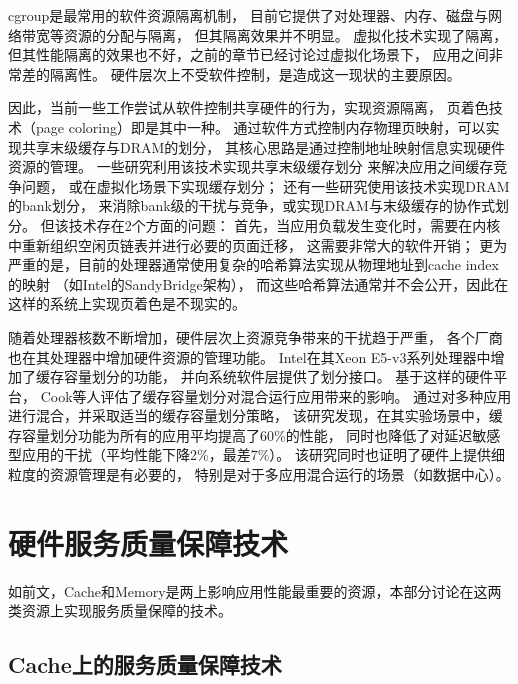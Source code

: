 cgroup\cite{cgroup}是最常用的软件资源隔离机制，
目前它提供了对处理器、内存、磁盘与网络带宽等资源的分配与隔离，
但其隔离效果并不明显。
虚拟化技术实现了隔离，但其性能隔离的效果也不好，之前的章节已经讨论过虚拟化场景下，
应用之间非常差的隔离性。
硬件层次上不受软件控制，是造成这一现状的主要原因。

因此，当前一些工作尝试从软件控制共享硬件的行为，实现资源隔离，
页着色技术（page coloring）即是其中一种。
通过软件方式控制内存物理页映射，可以实现共享末级缓存与DRAM的划分，
其核心思路是通过控制地址映射信息实现硬件资源的管理。
一些研究利用该技术实现共享末级缓存划分\cite{lin_gaining_2008, tam_managing_2007}
来解决应用之间缓存竞争问题，
或在虚拟化场景下实现缓存划分\cite{Jin2009, Chen2010, Wang2012}；
还有一些研究\cite{liu_software_2012}使用该技术实现DRAM的bank划分，
来消除bank级的干扰与竞争，或实现DRAM与末级缓存的协作式划分\cite{Liu:2014:ISCA}。
但该技术存在2个方面的问题：
首先，当应用负载发生变化时，需要在内核中重新组织空闲页链表并进行必要的页面迁移，
这需要非常大的软件开销；
更为严重的是，目前的处理器通常使用复杂的哈希算法实现从物理地址到cache index的映射
（如Intel的SandyBridge架构），
而这些哈希算法通常并不会公开，因此在这样的系统上实现页着色是不现实的。

随着处理器核数不断增加，硬件层次上资源竞争带来的干扰趋于严重，
各个厂商也在其处理器中增加硬件资源的管理功能。
Intel在其Xeon E5-v3系列处理器中增加了缓存容量划分的功能，
并向系统软件层提供了划分接口。
基于这样的硬件平台，
Cook等人\cite{cook_hardware_2013}评估了缓存容量划分对混合运行应用带来的影响。
通过对多种应用进行混合，并采取适当的缓存容量划分策略，
该研究发现，在其实验场景中，缓存容量划分功能为所有的应用平均提高了60\%的性能，
同时也降低了对延迟敏感型应用的干扰（平均性能下降2\%，最差7\%）。
该研究同时也证明了硬件上提供细粒度的资源管理是有必要的，
特别是对于多应用混合运行的场景（如数据中心）。






\section{硬件服务质量保障技术}

如前文，Cache和Memory是两上影响应用性能最重要的资源，本部分讨论在这两类资源上实现服务质量保障的技术。


\subsection{Cache上的服务质量保障技术}

